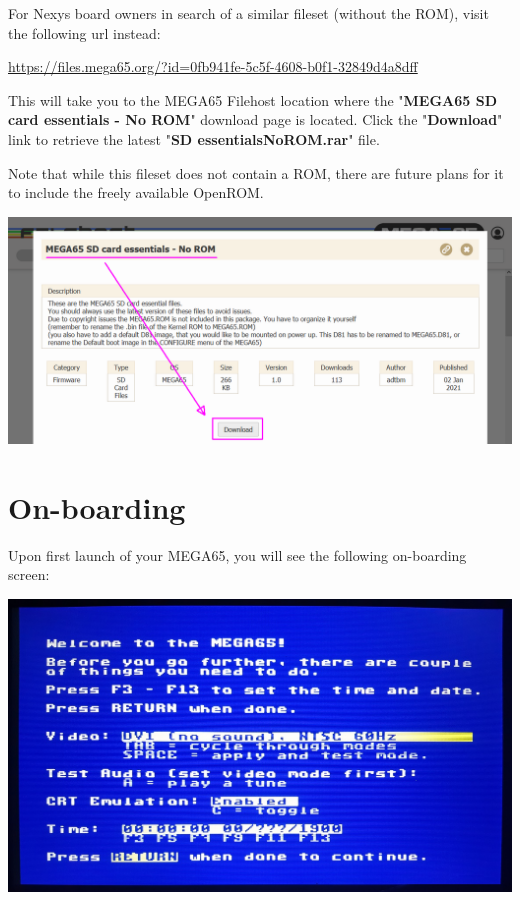 For Nexys board owners in search of a similar fileset (without the ROM), visit the following url instead:

\url{https://files.mega65.org/?id=0fb941fe-5c5f-4608-b0f1-32849d4a8dff}

This will take you to the MEGA65 Filehost location where the "\textbf{MEGA65 SD card essentials - No ROM}" download page is located. Click the "\textbf{Download}" link to retrieve the latest "\textbf{SD essentialsNoROM.rar}" file.

Note that while this fileset does not contain a ROM, there are future plans for it to include the freely available OpenROM.

\includegraphics[width=\linewidth]{images/latest_support_files.png}

\section{On-boarding}

Upon first launch of your MEGA65, you will see the following on-boarding screen:

\begin{center}
  \includegraphics[width=\linewidth]{images/img011_final_boot_01.jpg}
\end{center}

